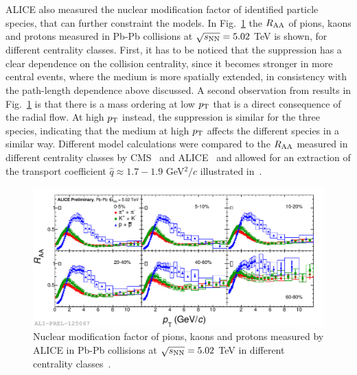 ALICE also measured the nuclear modification factor of identified particle species, that can further constraint the models. In Fig.~\ref{fig:PiKPRaa5TeV} the $R_{\rm AA}$ of pions, kaons and protons measured in Pb-Pb collisions at $\sqrt{s_{\rm NN}} = 5.02$ TeV is shown, for different centrality classes. First, it has to be noticed that the suppression has a clear dependence on the collision centrality, since it becomes stronger in more central events, where the medium is more spatially extended, in consistency with the path-length dependence above discussed. A second observation from results in Fig.~\ref{fig:PiKPRaa5TeV} is that there is a mass ordering at low $p_{\rm T}$ that is a direct consequence of the radial flow. At high $p_{\rm T}$ instead, the suppression is similar for the three species, indicating that the medium at high $p_{\rm T}$ affects the different species in a similar way. Different model calculations were compared to the $R_{\rm AA}$ measured in different centrality classes by CMS~\cite{CMS:2012aa} and ALICE~\cite{Abelev:2012hxa} and allowed for an extraction of the transport coefficient $\hat{q} \approx 1.7-1.9$ GeV$^2/c$ illustrated in~\cite{Burke:2013yra,Liu:2015vna}. 
\begin{figure}[!ht]
  \centering
  \includegraphics[width=15cm]{FigCap1/KPiPRAA5TeV.pdf}
  \caption{Nuclear modification factor of pions, kaons and protons measured by ALICE in Pb-Pb collisions at $\sqrt{s_{\rm NN}} = 5.02$ TeV in different centrality classes~\cite{Jacazio:2017dvy}.}
  \label{fig:PiKPRaa5TeV}
\end{figure}

